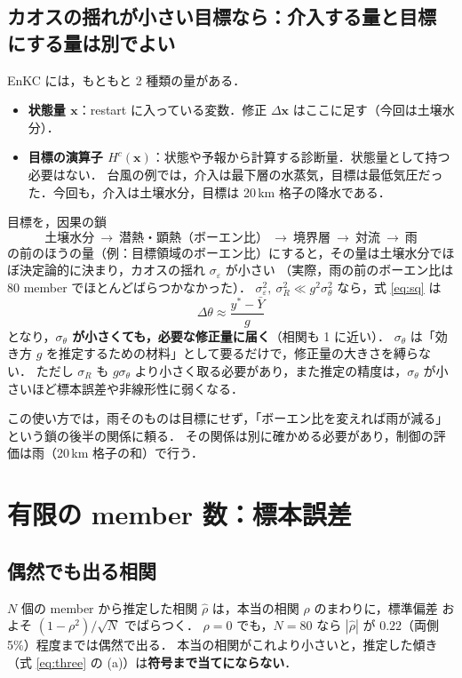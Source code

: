 \documentclass[dvipdfmx,a4paper,10.5pt]{jarticle}
\numberwithin{equation}{section}
\newcommand{\x}{\bm{x}}
\begin{document}
\subsection{カオスの揺れが小さい目標なら：介入する量と目標にする量は別でよい}\label{sec:proxy}
EnKC には，もともと 2 種類の量がある．
\begin{itemize}
  \item \textbf{状態量 $\x$}：restart に入っている変数．修正 $\Delta\x$ はここに足す（今回は土壌水分）．
  \item \textbf{目標の演算子 $H^c(\x)$}：状態や予報から計算する診断量．状態量として持つ必要はない．
        台風の例では，介入は最下層の水蒸気，目標は最低気圧だった．今回も，介入は土壌水分，目標は 20\,km 格子の降水である．
\end{itemize}
目標を，因果の鎖
\[
  \text{土壌水分}\ \to\ \text{潜熱・顕熱（ボーエン比）}\ \to\ \text{境界層}\ \to\ \text{対流}\ \to\ \text{雨}
\]
の前のほうの量（例：目標領域のボーエン比）にすると，その量は土壌水分でほぼ決定論的に決まり，カオスの揺れ $\sigma_\varepsilon$ が小さい
（実際，雨の前のボーエン比は 80 member でほとんどばらつかなかった）．
$\sigma_\varepsilon^2,\ \sigma_R^2 \ll g^2\sigma_\theta^2$ なら，式 \eqref{eq:sq} は
\begin{equation}
  \Delta\theta \approx \frac{y^*-\bar Y}{g}
\end{equation}
となり，\textbf{$\sigma_\theta$ が小さくても，必要な修正量に届く}（相関も 1 に近い）．
$\sigma_\theta$ は「効き方 $g$ を推定するための材料」として要るだけで，修正量の大きさを縛らない．
ただし $\sigma_R$ も $g\sigma_\theta$ より小さく取る必要があり，また推定の精度は，$\sigma_\theta$ が小さいほど標本誤差や非線形性に弱くなる．

この使い方では，雨そのものは目標にせず，「ボーエン比を変えれば雨が減る」という鎖の後半の関係に頼る．
その関係は別に確かめる必要があり，制御の評価は雨（20\,km 格子の和）で行う．

\section{有限の member 数：標本誤差}\label{sec:sample}

\subsection{偶然でも出る相関}
$N$ 個の member から推定した相関 $\hat\rho$ は，本当の相関 $\rho$ のまわりに，標準偏差 およそ $(1-\rho^2)/\sqrt{N}$ でばらつく．
$\rho=0$ でも，$N=80$ なら $|\hat\rho|$ が $0.22$（両側 5\%）程度までは偶然で出る．
本当の相関がこれより小さいと，推定した傾き（式 \eqref{eq:three} の (a)）は\textbf{符号まで当てにならない}．
\end{document}
